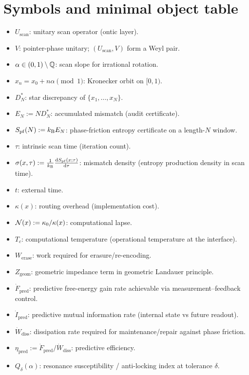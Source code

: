 \section{Symbols and minimal object table}
\label{app:symbols}

\begin{itemize}
  \item $U_{\mathrm{scan}}$: unitary scan operator (ontic layer).
  \item $V$: pointer-phase unitary; $(U_{\mathrm{scan}},V)$ form a Weyl pair.
  \item $\alpha\in(0,1)\setminus\mathbb{Q}$: scan slope for irrational rotation.
  \item $x_n=x_0+n\alpha\pmod 1$: Kronecker orbit on $[0,1)$.
  \item $D_N^\ast$: star discrepancy of $\{x_1,\dots,x_N\}$.
  \item $E_N := N D_N^\ast$: accumulated mismatch (audit certificate).
  \item $S_{\mathrm{pf}}(N) := k_{\mathrm{B}} E_N$: phase-friction entropy certificate on a length-$N$ window.
  \item $\tau$: intrinsic scan time (iteration count).
  \item $\sigma(x,\tau) := \frac{1}{k_{\mathrm{B}}}\frac{\mathrm{d} S_{\mathrm{pf}}(x;\tau)}{\mathrm{d}\tau}$: mismatch density (entropy production density in scan time).
  \item $t$: external time.
  \item $\kappa(x)$: routing overhead (implementation cost).
  \item $\mathcal{N}(x) := \kappa_0/\kappa(x)$: computational lapse.
  \item $T_c$: computational temperature (operational temperature at the interface).
  \item $W_{\mathrm{erase}}$: work required for erasure/re-encoding.
  \item $Z_{\mathrm{geom}}$: geometric impedance term in geometric Landauer principle.
  \item $\dot F_{\mathrm{pred}}$: predictive free-energy gain rate achievable via measurement--feedback control.
  \item $\dot I_{\mathrm{pred}}$: predictive mutual information rate (internal state vs future readout).
  \item $\dot W_{\mathrm{diss}}$: dissipation rate required for maintenance/repair against phase friction.
  \item $\eta_{\mathrm{pred}} := \dot F_{\mathrm{pred}}/\dot W_{\mathrm{diss}}$: predictive efficiency.
  \item $Q_\delta(\alpha)$: resonance susceptibility / anti-locking index at tolerance $\delta$.
\end{itemize}


